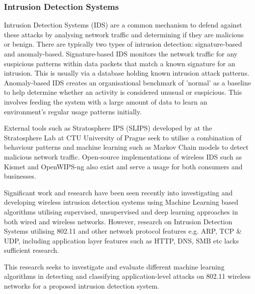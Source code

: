 
\subsubsection{Intrusion Detection Systems}

\smallskip

Intrusion Detection Systems (IDS) are a common mechanism to defend against these attacks by analysing network traffic and determining if they are malicious or benign. There are typically two types of intrusion detection: signature-based and anomaly-based. Signature-based IDS monitors the network traffic for any suspicious patterns within data packets that match a known signature for an intrusion. This is usually via a database holding known intrusion attack patterns. Anomaly-based IDS creates an organisational benchmark of 'normal' as a baseline to help determine whether an activity is considered unusual or suspicious. This involves feeding the system with a large amount of data to learn an environment's regular usage patterns initially. 

External tools such as Stratosphere IPS (SLIPS) developed by \textcite{garcia_2015_slips} at the Stratosphere Lab at CTU University of Prague seek to utilise a combination of behaviour patterns and machine learning such as Markov Chain models to detect malicious network traffic. Open-source implementations of wireless IDS such as Kismet \parencite{kismet_2002_kismet} and OpenWIPS-ng \parencite{thomasdotreppe_2011_openwipsng} also exist and serve a usage for both consumers and businesses.

\medskip
Significant work and research have been seen recently into investigating and developing wireless intrusion detection systems using Machine Learning based algorithms utilising supervised, unsupervised and deep learning approaches in both wired and wireless networks. However, research on Intrusion Detection Systems utilising 802.11 and other network protocol features e.g. ARP, TCP \& UDP, including application layer features such as HTTP, DNS, SMB etc lacks sufficient research.

This research seeks to investigate and evaluate different machine learning algorithms in detecting and classifying application-level attacks on 802.11 wireless networks for a proposed intrusion detection system. 

